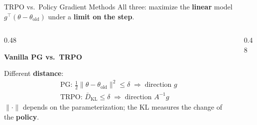 \documentclass[aspectratio=169]{beamer}
\newcommand{\told}{\theta_{\mathrm{old}}}
\begin{document}
\begin{frame}[label=trpo-prior]{TRPO vs.\ Policy Gradient Methods}
  \centering\small\vspace*{4pt}
  All three: maximize the \textbf{linear} model $g^\top(\theta-\told)$ under a \textbf{limit on the step}.\par\vspace{8pt}
  \begin{columns}[T]
    \begin{column}{0.48\textwidth}
      \begin{warmbox}[equal height group=trpo_prior]
        \small\textbf{\color{AtlasWarm}Vanilla PG vs.\ TRPO}\par\vspace{2pt}
        Different \textbf{distance}:
        \begin{gather*}
          \text{PG: } \tfrac12\|\theta-\told\|^2\le\delta \;\Rightarrow\; \text{direction } g\\
          \text{TRPO: } \bar D_{\mathrm{KL}}\le\delta \;\Rightarrow\; \text{direction } A^{-1}g
        \end{gather*}
        $\|\cdot\|$ depends on the parameterization; the KL measures the change of the \textbf{policy}.
      \end{warmbox}
    \end{column}
    \begin{column}{0.48\textwidth}
    \end{column}
  \end{columns}

\end{frame}
\end{document}

